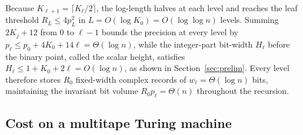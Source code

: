Because $K_{\ell+1} = \lceil K_\ell / 2 \rceil$, the log-length halves at each level and reaches the leaf threshold $R_L \le 4 p_L^2$ in $L = O(\log K_0) = O(\log \log n)$ levels. Summing $2 K_j + 12$ from $0$ to $\ell - 1$ bounds the precision at every level by $p_\ell \le p_0 + 4 K_0 + 14 \ell = \Theta(\log n)$, while the integer-part bit-width $H_\ell$ before the binary point, called the scalar height, satisfies $H_\ell \le 1 + K_0 + 2\ell = O(\log n)$, as shown in Section~\ref{sec:prelim}. Every level therefore stores $R_0$ fixed-width complex records of $w_\ell = \Theta(\log n)$ bits, maintaining the invariant bit volume $R_0 p_\ell = \Theta(n)$ throughout the recursion.

\subsection{Cost on a multitape Turing machine}\label{sec:overview-cost}

